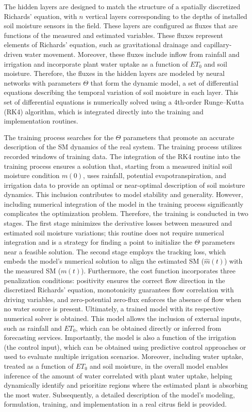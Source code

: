\documentclass[pdflatex,sn-nature]{sn-jnl}%
\theoremstyle{thmstyleone}%
\theoremstyle{thmstyletwo}%
\theoremstyle{thmstylethree}%
\begin{document}
The hidden layers are designed to match the structure of a spatially discretized Richards' equation, with $n$ vertical layers corresponding to the depths of installed soil moisture sensors in the field. These layers are configured as fluxes that are functions of the measured and estimated variables. These fluxes represent elements of Richards' equation, such as gravitational drainage and capillary-driven water movement. Moreover, these fluxes include inflow from rainfall and irrigation and incorporate plant water uptake as a function of $ET_0$ and soil moisture. Therefore, the fluxes in the hidden layers are modeled by neural networks with parameters $\Theta$ that form the dynamic model, a set of differential equations describing the temporal variation of soil moisture in each layer. This set of differential equations is numerically solved using a 4th-order Runge–Kutta (RK4) algorithm, which is integrated directly into the training and implementation routines.

The training process searches for the $\Theta$ parameters that promote an accurate description of the SM dynamics of the real system. The training process utilizes recorded windows of training data. The integration of the RK4 routine into the training process ensures a solution that, starting from a measured initial soil moisture condition $m(0)$, uses rainfall, potential evapotranspiration, and irrigation data to provide an optimal or near-optimal description of soil moisture dynamics. This inclusion contributes to model stability and generality. However, including numerical integration of the model in the training process significantly complicates the optimization problem. Therefore, the training is conducted in two stages. The first stage minimizes the derivative losses between measured and estimated soil moisture variations; this routine does not require numerical integration and is a strategy for finding a point to initialize the $\Theta$ parameters near a feasible solution. The second stage employs the tracking loss, which embeds the model's numerical solution to align the estimated SM ($\hat{m}(t)$) with the measured SM ($m(t)$).
Furthermore, the cost function incorporates three penalization conditions: positivity ensures the correct flow direction in the discretized Richards' equation, monotonicity guarantees flow correlation with driving variables, and zero-potential zero-flux enforces the absence of flow when no water source is present.
Ultimately, a trained model with its respective numerical solver is obtained. This model allows the inclusion of external inputs, such as rainfall and $ET_0$, which can be obtained directly or inferred from forecasting services. Importantly, the model is also a function of the irrigation (the control input), which can be obtained using predictive control approaches or used to evaluate multiple irrigation scenarios. Moreover, including water uptake, treated as a function of $ET_0$ and soil moisture, in the overall model enables inference of the amount of water correlated with plant water uptake, helping dynamically identify and prioritize regions where the estimated plant is absorbing the most water.
Subsequently, a detailed description of the model's modeling, formulation, training, and implementation in a real citrus field is provided.
\end{document}

